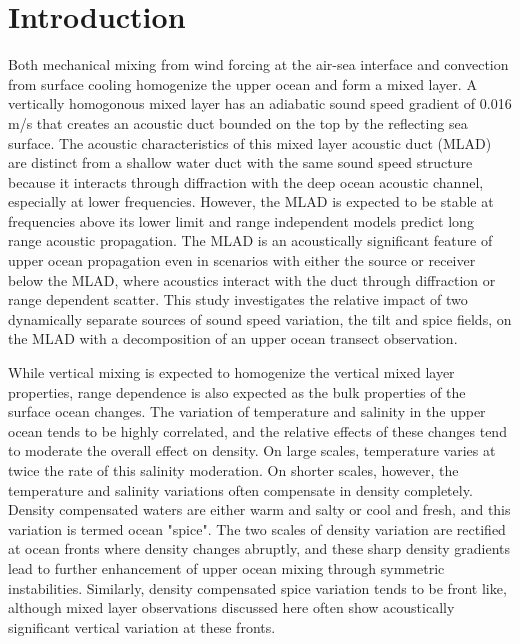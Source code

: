 \documentclass[preprint,NumberedRefs]{JASA}
\begin{document}
\section{\label{sec:intro} Introduction}
Both mechanical mixing from wind forcing at the air-sea interface and convection from surface cooling homogenize the upper ocean and form a mixed layer\citep{cole2010seasonal}. A vertically homogonous mixed layer has an adiabatic sound speed gradient of 0.016 m/s that creates an acoustic duct bounded on the top by the reflecting sea surface. The acoustic characteristics of this mixed layer acoustic duct (MLAD) are distinct from a shallow water duct with the same sound speed structure because it interacts through diffraction with the deep ocean acoustic channel\citep{porter93}, especially at lower frequencies. However, the MLAD is expected to be stable at frequencies above its lower limit\citep{Urick1982Prop} and range independent models predict long range acoustic propagation. The MLAD is an acoustically significant feature of upper ocean propagation even in scenarios with either the source or receiver below the MLAD, where acoustics interact with the duct through diffraction or range dependent scatter\citep{colosi21}. This study investigates the relative impact of two dynamically separate sources of sound speed variation, the tilt and spice fields, on the MLAD with a decomposition of an upper ocean transect observation.

While vertical mixing is expected to homogenize the vertical mixed layer properties, range dependence is also expected as the bulk properties of the surface ocean changes\citep{ferrari2000}. The variation of temperature and salinity in the upper ocean tends to be highly correlated, and the relative effects of these changes tend to moderate the overall effect on density. On large scales, temperature varies at twice the rate of this salinity moderation. On shorter scales, however, the temperature and salinity variations often compensate in density completely. Density compensated waters are either warm and salty or cool and fresh, and this variation is termed ocean "spice"\citep{munk1981evolution}. The two scales of density variation are rectified at ocean fronts where density changes abruptly, and these sharp density gradients lead to further enhancement of upper ocean mixing through symmetric instabilities\citep{dasaro2011}. Similarly, density compensated spice variation tends to be front like, although mixed layer observations discussed here often show acoustically significant vertical variation at these fronts.
\end{document}
